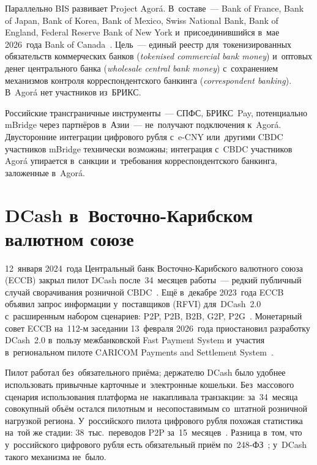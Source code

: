 Параллельно BIS развивает Project Agorá. В~составе~--- Bank of France, Bank of
Japan, Bank of Korea, Bank of Mexico, Swiss National Bank, Bank of England,
Federal Reserve Bank of New York и~присоединившийся в~мае 2026~года Bank
of Canada~\cite{bis-project-agora,bis-agora-2026}. Цель~---
единый реестр для~токенизированных обязательств
коммерческих банков (\textit{tokenised commercial bank money}) и~оптовых денег
центрального банка (\textit{wholesale central bank money}) с~сохранением
механизмов контроля корреспондентского банкинга (\textit{correspondent banking}).
В~Agorá нет участников из~БРИКС.

Российские трансграничные инструменты~--- СПФС, БРИКС~Pay, потенциально mBridge
через партнёров в~Азии~--- не~получают подключения к~Agorá. Двусторонние
интеграции цифрового рубля с~e-CNY или~другими CBDC участников mBridge
технически возможны; интеграция с~CBDC участников Agorá упирается в~санкции
и~требования корреспондентского банкинга, заложенные в~Agorá.

\section{{DCash} в~Восточно-Карибском валютном союзе}\label{sec:cbdc-dcash}

12~января 2024~года Центральный банк Восточно-Карибского валютного союза (ECCB)
закрыл пилот DCash после~34~месяцев работы~--- редкий публичный случай сворачивания
розничной CBDC~\cite{eccb-dcash-shutdown-2024}. Ещё в~декабре 2023~года ECCB
объявил запрос информации у~поставщиков (RFVI) для~DCash~2.0 с~расширенным
набором сценариев: P2P, P2B, B2B, G2P,
P2G~\cite{eccb-dcash-2-rfvi-2025,dpf-dcash-2-rfvi-2023}. Монетарный совет ECCB
на~112-м заседании 13~февраля 2026~года приостановил разработку DCash~2.0 в~пользу межбанковской
Fast Payment System и~участия в~региональном пилоте CARICOM Payments and
Settlement System~\cite{eccb-mc-112-2026}.

Пилот работал без~обязательного приёма; держателю DCash было удобнее
использовать привычные карточные и~электронные кошельки. Без~массового сценария
использования платформа не~накапливала транзакции: за~34~месяца совокупный объём
остался пилотным и~несопоставимым со~штатной розничной нагрузкой региона.
У~российского пилота цифрового рубля похожая статистика на~той же стадии:
38~тыс.\ переводов P2P за~15~месяцев~\cite{cbr-onrnps-2025}. Разница в~том,
что у~российского цифрового рубля есть обязательный приём по~248-ФЗ~\cite{fz-248};
у~DCash такого механизма не~было.


